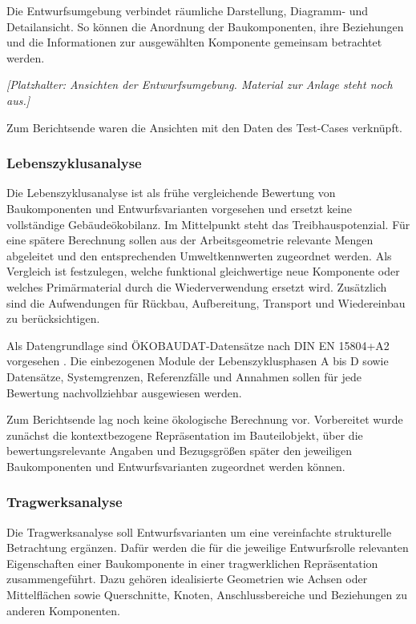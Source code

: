 \documentclass[type=zwischenbericht]{zukunftbau}
\begin{document}
Die Entwurfsumgebung verbindet räumliche Darstellung, Diagramm- und Detailansicht. So können die Anordnung der Baukomponenten, ihre Beziehungen und die Informationen zur ausgewählten Komponente gemeinsam betrachtet werden.

\begin{Figure}[title=Ansichten der Entwurfsumgebung]
\textit{[Platzhalter: Ansichten der Entwurfsumgebung. Material zur Anlage steht noch aus.]}
\end{Figure}

Zum Berichtsende waren die Ansichten mit den Daten des Test-Cases verknüpft.

\subsubsection{Lebenszyklusanalyse}
Die Lebenszyklusanalyse ist als frühe vergleichende Bewertung von Baukomponenten und Entwurfsvarianten vorgesehen und ersetzt keine vollständige Gebäudeökobilanz. Im Mittelpunkt steht das Treibhauspotenzial. Für eine spätere Berechnung sollen aus der Arbeitsgeometrie relevante Mengen abgeleitet und den entsprechenden Umweltkennwerten zugeordnet werden. Als Vergleich ist festzulegen, welche funktional gleichwertige neue Komponente oder welches Primärmaterial durch die Wiederverwendung ersetzt wird. Zusätzlich sind die Aufwendungen für Rückbau, Aufbereitung, Transport und Wiedereinbau zu berücksichtigen.

Als Datengrundlage sind ÖKOBAUDAT-Datensätze nach DIN EN 15804+A2 vorgesehen \cite{din-en-15804-umweltproduktdeklarationen-2022,bbsr-oekobaudat-handbuch-2023}. Die einbezogenen Module der Lebenszyklusphasen A bis D sowie Datensätze, Systemgrenzen, Referenzfälle und Annahmen sollen für jede Bewertung nachvollziehbar ausgewiesen werden.

Zum Berichtsende lag noch keine ökologische Berechnung vor. Vorbereitet wurde zunächst die kontextbezogene Repräsentation im Bauteilobjekt, über die bewertungsrelevante Angaben und Bezugsgrößen später den jeweiligen Baukomponenten und Entwurfsvarianten zugeordnet werden können.

\subsubsection{Tragwerksanalyse}
Die Tragwerksanalyse soll Entwurfsvarianten um eine vereinfachte strukturelle Betrachtung ergänzen. Dafür werden die für die jeweilige Entwurfsrolle relevanten Eigenschaften einer Baukomponente in einer tragwerklichen Repräsentation zusammengeführt. Dazu gehören idealisierte Geometrien wie Achsen oder Mittelflächen sowie Querschnitte, Knoten, Anschlussbereiche und Beziehungen zu anderen Komponenten.
\end{document}
